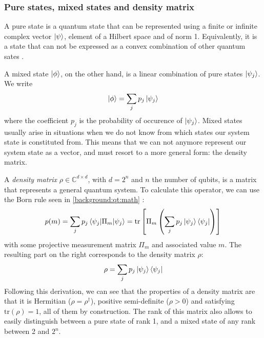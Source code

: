 \documentclass[12pt]{memoir}
\newcommand{\tr}{\text{tr}}
\begin{document}
\subsubsection*{Pure states, mixed states and density matrix}
A pure state is a quantum state that can be represented using a finite or infinite complex vector $\ket \psi$, element of a Hilbert space and of norm 1. Equivalently, it is a state that can not be expressed as a convex combination of other quantum sates \cite{wiki:density-matrix}.\medbreak

A mixed state $\ket \phi$, on the other hand, is a linear combination of pure states $\ket {\psi_j}$. We write 
\begin{equation}
    \ket \phi = \sum_j p_j \ket {\psi_j} 
\end{equation}
where the coefficient $p_j$ is the probability of occurence of $\ket {\psi_j}$. Mixed states usually arise in situations when we do not know from which states our system state is constituted from. This means that we can not anymore represent our system state as a vector, and must resort to a more general form: the density matrix.\medbreak

A \textit{density matrix} $\rho \in \mathbb{C}^{d \times d}$, with $d = 2^n$ and $n$ the number of qubits, is a matrix that represents a general quantum system.
To calculate this operator, we can use the Born rule seen in \ref{background:qt:math} \cite{wiki:density-matrix}:
\begin{equation}
    p(m) = \sum_j p_j \braket{\psi_j|\Pi_m|\psi_j} = \tr\left[\Pi_m \left(\sum_j p_j \ket{\psi_j}\bra{\psi_j}\right)\right]
\end{equation}
with some projective measurement matrix $\Pi_m$ and associated value $m$. The resulting part on the right corresponds to the density matrix $\rho$:
\begin{equation}
    \rho = \sum_j p_j \ket{\psi_j}\bra{\psi_j}
\end{equation}
Following this derivation, we can see that the properties of a density matrix are that it is Hermitian ($\rho = \rho^{\dagger}$), positive semi-definite ($\rho > 0$) and satisfying $\tr(\rho) = 1$, all of them by construction. The rank of this matrix also allows to easily distinguish between a pure state of rank 1, and a mixed state of any rank between 2 and $2^n$.
\end{document}
